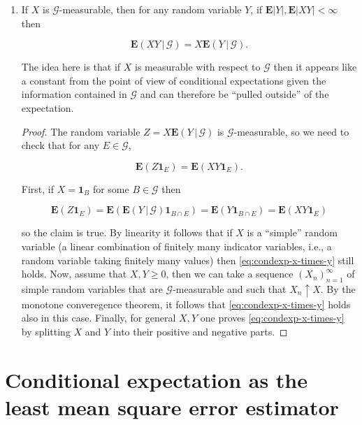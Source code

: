 \documentclass[11pt]{report}
\theoremstyle{plain}
\theoremstyle{definition}
\newtheorem{xexercise}[thm]{Exercise}
\begin{document}
\begin{enumerate}[label=\arabic*.]
\begin{xexercise}
Prove this.
\end{xexercise}

\item If $X$ is $\mathcal{G}$-measurable, then for any
random variable $Y$, if
$\mathbf{E}|Y|, \mathbf{E}|XY|<\infty$ then

\[
\mathbf{E}\left(XY\,|\,\mathcal{G}\right) = X \mathbf{E}\left(Y\,|\,\mathcal{G}\right).
\]

\noindent The idea here is that if $X$ is measurable with
respect to $\mathcal{G}$ then it appears like a
constant from the point of view of conditional
expectations given the information contained in
$\mathcal{G}$ and can therefore be ``pulled outside''
of the expectation.

\begin{proof}
The random variable
$Z=X\mathbf{E}\left(Y\,|\,\mathcal{G}\right)$ is
$\mathcal{G}$-measurable, so we need to check that
for any $E\in \mathcal{G}$,

\begin{equation*} \tag{7}\label{eq:condexp-x-times-y}
\mathbf{E}(Z\mathbf{1}_E) = \mathbf{E}(XY \mathbf{1}_E).
\end{equation*}

\noindent First, if $X=\mathbf{1}_B$ for some $B\in\mathcal{G}$
then

\[
\mathbf{E}(Z \mathbf{1}_E) = \mathbf{E}(\mathbf{E}\left(Y\,|\,\mathcal{G}\right)\mathbf{1}_{B\cap E}) = \mathbf{E}(Y\mathbf{1}_{B\cap E})
= \mathbf{E}(XY \mathbf{1}_E)
\]

\noindent so the claim is true. By linearity it follows that if
$X$ is a ``simple'' random variable (a linear
combination of finitely many indicator variables,
i.e., a random variable taking finitely many values)
then \eqref{eq:condexp-x-times-y} still holds. Now, assume
that $X,Y\ge 0$, then we can take a sequence
$(X_n)_{n=1}^\infty$ of simple random variables that
are $\mathcal{G}$-measurable and such that
$X_n\uparrow X$. By the monotone converegence
theorem, it follows that \eqref{eq:condexp-x-times-y}
holds also in this case. Finally, for general $X,Y$
one proves \eqref{eq:condexp-x-times-y} by splitting $X$
and $Y$ into their positive and negative parts.
\end{proof}
\end{enumerate}

\section{Conditional expectation as the least mean square error estimator}
\end{document}

